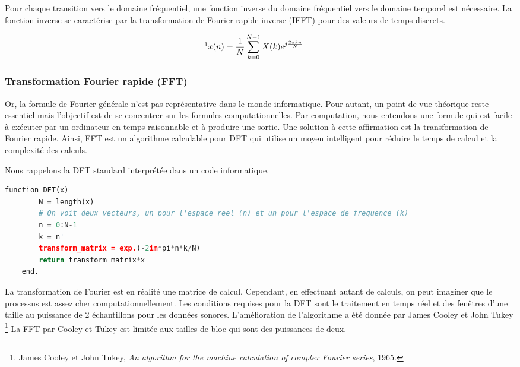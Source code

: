 Pour chaque transition vers le domaine fréquentiel, une fonction inverse du domaine fréquentiel vers le domaine temporel est nécessaire. La fonction inverse se caractérise par la transformation de Fourier rapide inverse (IFFT) pour des valeurs de temps discrets.

\begin{equation}
\footnote{Alan V. Oppenheim et Ronald W. Schafer, \textit{Discrete-time signal processing}, 2009. [pp. 822 - 835] \nocite{Sch09} }
    x(n) = \frac{1}{N} \sum_{ k = 0} ^ {N-1} X(k) e ^ {j \frac{2 \pi k n}{N}} \hspace{5mm} 
\end{equation}



    \subsubsection{Transformation Fourier rapide (FFT)}

Or, la formule de Fourier générale n'est pas représentative dans le monde informatique. Pour autant, un point de vue théorique reste essentiel mais l'objectif est de se concentrer sur les formules computationnelles. Par computation, nous entendons une formule qui est facile à exécuter par un ordinateur en temps raisonnable et à produire une sortie. Une solution à cette affirmation est la transformation de Fourier rapide. Ainsi, FFT est un algorithme calculable pour DFT qui utilise un moyen intelligent pour réduire le temps de calcul et la complexité des calculs.

Nous rappelons la DFT standard interprétée dans un code informatique.

\noindent\begin{minipage}{\textwidth}
    \begin{lstlisting}[language=Python, caption= DFT]
    function DFT(x)
        N = length(x)
        # On voit deux vecteurs, un pour l'espace reel (n) et un pour l'espace de frequence (k) 
        n = 0:N-1
        k = n'
        transform_matrix = exp.(-2im*pi*n*k/N)
        return transform_matrix*x
    end.
    \end{lstlisting}
\end{minipage}

La transformation de Fourier est en réalité une matrice de calcul. Cependant, en effectuant autant de calculs, on peut imaginer que le processus est assez cher computationnellement. Les conditions requises pour la DFT sont le traitement en temps réel et des fenêtres d’une taille au puissance de 2 échantillons pour les données sonores. L'amélioration de l'algorithme a été donnée par James Cooley et John Tukey \footnote{James Cooley et John Tukey, \textit{An algorithm for the machine calculation of complex Fourier series}, 1965. \nocite{Fourier_complex}} La FFT par Cooley et Tukey est limitée aux tailles de bloc qui sont des puissances de deux.
 
